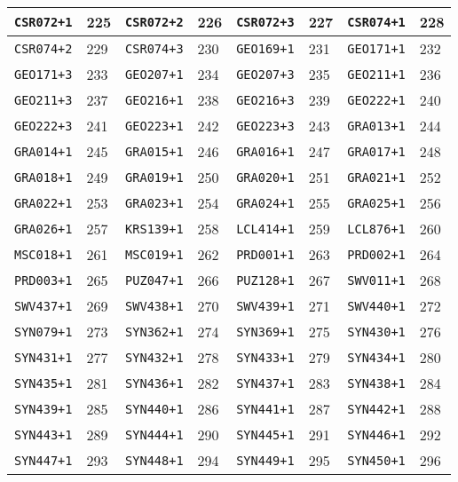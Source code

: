 \documentclass[./main.tex]{subfiles}
\begin{document}
\begin{table}[H]
\begin{tabularx}{\textwidth}{| X | X | X | X | X | X | X | X |}
\hline
\texttt{CSR072+1} & 225 & \texttt{CSR072+2} & 226 & \texttt{CSR072+3} & 227 & \texttt{CSR074+1} & 228\\
\hline
\texttt{CSR074+2} & 229 & \texttt{CSR074+3} & 230 & \texttt{GEO169+1} & 231 & \texttt{GEO171+1} & 232\\
\hline
\texttt{GEO171+3} & 233 & \texttt{GEO207+1} & 234 & \texttt{GEO207+3} & 235 & \texttt{GEO211+1} & 236\\
\hline
\texttt{GEO211+3} & 237 & \texttt{GEO216+1} & 238 & \texttt{GEO216+3} & 239 & \texttt{GEO222+1} & 240\\
\hline
\texttt{GEO222+3} & 241 & \texttt{GEO223+1} & 242 & \texttt{GEO223+3} & 243 & \texttt{GRA013+1} & 244\\
\hline
\texttt{GRA014+1} & 245 & \texttt{GRA015+1} & 246 & \texttt{GRA016+1} & 247 & \texttt{GRA017+1} & 248\\
\hline
\texttt{GRA018+1} & 249 & \texttt{GRA019+1} & 250 & \texttt{GRA020+1} & 251 & \texttt{GRA021+1} & 252\\
\hline
\texttt{GRA022+1} & 253 & \texttt{GRA023+1} & 254 & \texttt{GRA024+1} & 255 & \texttt{GRA025+1} & 256\\
\hline
\texttt{GRA026+1} & 257 & \texttt{KRS139+1} & 258 & \texttt{LCL414+1} & 259 & \texttt{LCL876+1} & 260\\
\hline
\texttt{MSC018+1} & 261 & \texttt{MSC019+1} & 262 & \texttt{PRD001+1} & 263 & \texttt{PRD002+1} & 264\\
\hline
\texttt{PRD003+1} & 265 & \texttt{PUZ047+1} & 266 & \texttt{PUZ128+1} & 267 & \texttt{SWV011+1} & 268\\
\hline
\texttt{SWV437+1} & 269 & \texttt{SWV438+1} & 270 & \texttt{SWV439+1} & 271 & \texttt{SWV440+1} & 272\\
\hline
\texttt{SYN079+1} & 273 & \texttt{SYN362+1} & 274 & \texttt{SYN369+1} & 275 & \texttt{SYN430+1} & 276\\
\hline
\texttt{SYN431+1} & 277 & \texttt{SYN432+1} & 278 & \texttt{SYN433+1} & 279 & \texttt{SYN434+1} & 280\\
\hline
\texttt{SYN435+1} & 281 & \texttt{SYN436+1} & 282 & \texttt{SYN437+1} & 283 & \texttt{SYN438+1} & 284\\
\hline
\texttt{SYN439+1} & 285 & \texttt{SYN440+1} & 286 & \texttt{SYN441+1} & 287 & \texttt{SYN442+1} & 288\\
\hline
\texttt{SYN443+1} & 289 & \texttt{SYN444+1} & 290 & \texttt{SYN445+1} & 291 & \texttt{SYN446+1} & 292\\
\hline
\texttt{SYN447+1} & 293 & \texttt{SYN448+1} & 294 & \texttt{SYN449+1} & 295 & \texttt{SYN450+1} & 296\\

\end{tabularx}
\end{table}
\end{document}
